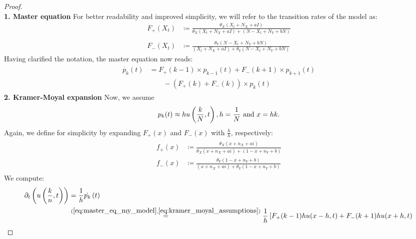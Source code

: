 \documentclass[12pt,a4paper,twoside]{article}
\begin{document}
\begin{proof}\phantom{lol}\\
	\textbf{1. Master equation}\newline
	For better readability and improved simplicity, we will refer to the transition rates of the model as:
	\begin{align*}
	F_+ \left(X_t\right) &\coloneqq\frac{\theta_X (X_t + N_X + aI)}{\theta_X (X_t + N_X + aI) + (N-X_t + N_Y + bN)} \\
	&\\
	F_- \left(X_t\right) &\coloneqq\frac{\theta_Y(N-X_t + N_Y + bN)}{(X_t + N_X + aI) + \theta_Y(N-X_t + N_Y + bN)}
	\end{align*}
	Having clarified the notation, the master equation now reads:
	\begin{align}\label{eq:master_eq_my_model}
	\begin{split}
	\dot{p_k}\left(t\right) &= F_+ \left(k-1\right)\times p_{k-1}\left(t\right) + F_- \left(k+1\right)\times p_{k+1}\left(t\right)\\
	&\qquad - \left(F_+\left(k\right) + F_-\left(k\right)\right)\times p_k\left(t\right)
	\end{split}
	\end{align}
	\textbf{2. Kramer-Moyal expansion}\newline
	Now, we assume
	\begin{equation}\label{eq:kramer_moyal_assumptions}
	p_k(t) \approx hu\left(\frac{k}{N}, t\right), h=\frac{1}{N}\textnormal{ and }x = hk.
	\end{equation} 
	Again, we define for simplicity by expanding $F_+(x)$ and $F_-(x)$ with $\frac{h}{h}$, respectively:
	\begin{align}\label{def:abbreviation_scaled_transition_rates}
	\begin{split}
	f_+(x) &\coloneqq \frac{\theta_X (x+ n_X+ ai)}{\theta_X (x + n_X + ai) + (1-x + n_Y + b)}\\
	f_-(x) &\coloneqq \frac{\theta_Y(1-x+n_Y+b)}{(x+n_X+ai) + \theta_Y(1-x+n_Y+b)}
	\end{split}
	\end{align}
	We compute:
	\begin{align}\label{comp:kramer_moyal_expansion}
	\begin{split}
	\partial_t \left(u\left(\frac{k}{n}, t\right)\right) &= \frac{1}{h}\dot{p_k}\left(t\right)\\
	&\overset{(\ref{eq:master_eq_my_model},\ref{eq:kramer_moyal_assumptions})}{=} \frac{1}{h}\left[F_+(k-1)hu(x-h,t) + F_-(k+1)hu(x+h,t)\right.\\

\end{split}
\end{align}
\end{proof}
\end{document}
